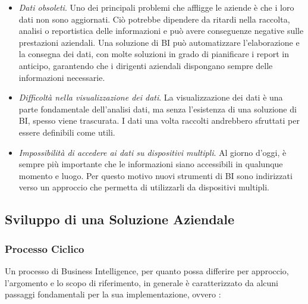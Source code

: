 \begin{itemize}
    \item \textit{Dati obsoleti}. Uno dei principali problemi che affligge le aziende è che i loro dati non sono aggiornati. Ciò potrebbe dipendere da ritardi nella raccolta, analisi o reportistica delle informazioni e può avere conseguenze negative sulle prestazioni aziendali. Una soluzione di BI può automatizzare l'elaborazione e la consegna dei dati, con molte soluzioni in grado di pianificare i report in anticipo, garantendo che i dirigenti aziendali dispongano sempre delle informazioni necessarie.
    \item \textit{Difficoltà nella visualizzazione dei dati}. La visualizzazione dei dati è una parte fondamentale dell'analisi dati, ma senza l'esistenza di una soluzione di BI, spesso viene trascurata. I dati una volta raccolti andrebbero sfruttati per essere definibili come utili.
    \item \textit{Impossibilità di accedere ai dati su dispositivi multipli}. Al giorno d'oggi, è sempre più importante che le informazioni siano accessibili in qualunque momento e luogo. Per questo motivo nuovi strumenti di BI sono indirizzati verso un approccio che permetta di utilizzarli da dispositivi multipli.
\end{itemize}

\subsection{Sviluppo di una Soluzione Aziendale}

\subsubsection{Processo Ciclico}
Un processo di Business Intelligence, per quanto possa differire per approccio, l'argomento e lo scopo di riferimento, in generale è caratterizzato da alcuni passaggi fondamentali per la sua implementazione, ovvero \cite{citeseerx_bi_process}:


